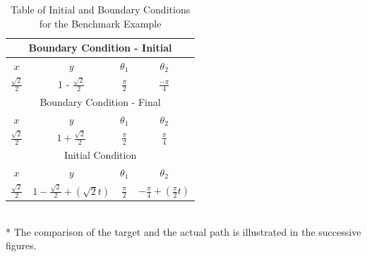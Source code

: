 \documentclass[letterpaper, 10 pt, conference]{ieeeconf}
\begin{document}
\begin{table}[h!]
    \begin{center}
    \label{tab:table1}
    \begin{tabular}{|c|c|c|c|}
    	\hline
        \multicolumn{4}{|c|}{Boundary Condition - Initial}     \\ 
        \hline
        \textbf{$x$} & \textbf{$y$} & \textbf{$\theta_1$} & \textbf{$\theta_2$}\\
        \hline
        $\frac{\sqrt{2}}{2}$ & 1 - $\frac{\sqrt{2}}{2}$ & $\frac{\pi}{2}$ & $\frac{-\pi}{4}$ \\
        \hline
        \multicolumn{4}{|c|}{Boundary Condition - Final}       \\ 
        \hline
        \textbf{$x$} & \textbf{$y$} & \textbf{$\theta_1$} & \textbf{$\theta_2$}\\
        \hline
        $\frac{\sqrt{2}}{2}$ & $1 + \frac{\sqrt{2}}{2}$ & $\frac{\pi}{2}$ & $\frac{\pi}{4}$  \\
        \hline
        \multicolumn{4}{|c|}{Initial Condition}                \\ 
        \hline
        \textbf{$x$} & \textbf{$y$} & \textbf{$\theta_1$} & \textbf{$\theta_2$}\\
        \hline
        $\frac{\sqrt{2}}{2}$ & $1 - \frac{\sqrt{2}}{2} + (\sqrt{2}t)$ & $\frac{\pi}{2}$ &  $-\frac{\pi}{4} + (\frac{\pi}{2}t)$							 \\
        \hline
    \end{tabular}
    \captionsetup{justification=centering}
    \caption{Table of Initial and Boundary Conditions \\ for the Benchmark Example}
    \end{center}
\end{table}
\\*
The comparison of the target and the actual path is illustrated in the successive figures.
\end{document}
